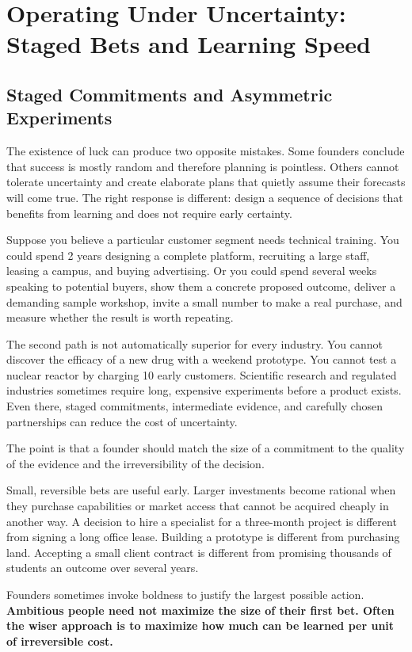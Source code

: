 \section{Operating Under Uncertainty: Staged Bets and Learning Speed}

\subsection{Staged Commitments and Asymmetric Experiments}

The existence of luck can produce two opposite mistakes. Some founders conclude that success is mostly random and therefore planning is pointless. Others cannot tolerate uncertainty and create elaborate plans that quietly assume their forecasts will come true. The right response is different: design a sequence of decisions that benefits from learning and does not require early certainty.

Suppose you believe a particular customer segment needs technical training. You could spend 2 years designing a complete platform, recruiting a large staff, leasing a campus, and buying advertising. Or you could spend several weeks speaking to potential buyers, show them a concrete proposed outcome, deliver a demanding sample workshop, invite a small number to make a real purchase, and measure whether the result is worth repeating.

The second path is not automatically superior for every industry. You cannot discover the efficacy of a new drug with a weekend prototype. You cannot test a nuclear reactor by charging 10 early customers. Scientific research and regulated industries sometimes require long, expensive experiments before a product exists. Even there, staged commitments, intermediate evidence, and carefully chosen partnerships can reduce the cost of uncertainty.

The point is that a founder should match the size of a commitment to the quality of the evidence and the irreversibility of the decision.

Small, reversible bets are useful early. Larger investments become rational when they purchase capabilities or market access that cannot be acquired cheaply in another way. A decision to hire a specialist for a three-month project is different from signing a long office lease. Building a prototype is different from purchasing land. Accepting a small client contract is different from promising thousands of students an outcome over several years.

Founders sometimes invoke boldness to justify the largest possible action. \textbf{Ambitious people need not maximize the size of their first bet. Often the wiser approach is to maximize how much can be learned per unit of irreversible cost.}

